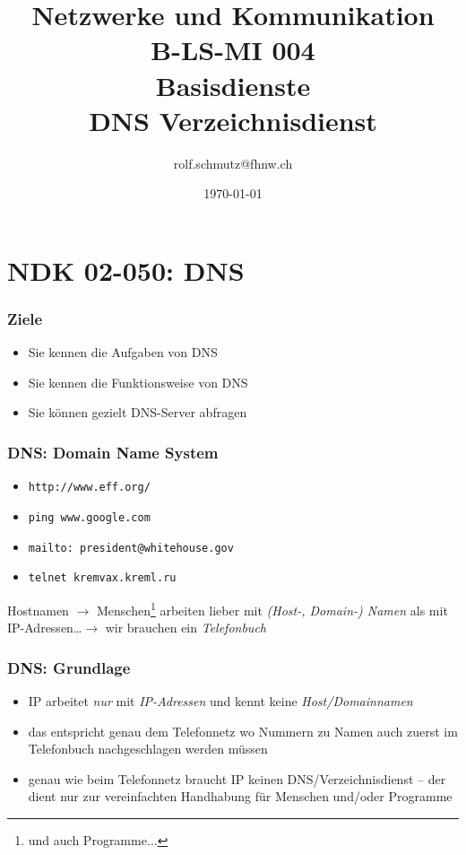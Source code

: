 \documentclass[ignorenonframetext]{beamer}
\date{\today}
\author{rolf.schmutz@fhnw.ch}
\institute{FHNW}
\title{Netzwerke und Kommunikation\\B-LS-MI 004\\Basisdienste\\DNS Verzeichnisdienst}
\begin{document}

\section{NDK 02-050: DNS}



\begin{frame}
\titlepage
\end{frame}



\begin{frame}
\frametitle{Ziele}
\begin{itemize}
	\item{Sie kennen die Aufgaben von DNS}
	\item{Sie kennen die Funktionsweise von DNS}
	\item{Sie k\"onnen gezielt DNS-Server abfragen}
\end{itemize}
\end{frame}



\begin{frame}
\frametitle{DNS: Domain Name System}
\begin{itemize}
	\item{\begin{Huge}\texttt{http://www.eff.org/}\end{Huge}}
	\item{\begin{Huge}\texttt{ping www.google.com}\end{Huge}}
	\item{\begin{Huge}\texttt{mailto: president@whitehouse.gov}\end{Huge}}
	\item{\begin{Huge}\texttt{telnet kremvax.kreml.ru}\end{Huge}}
\end{itemize}
\begin{block}{Hostnamen}
$\rightarrow$ Menschen\footnote{und auch Programme$\ldots$} arbeiten lieber mit {\em (Host-, Domain-) Namen} als mit IP-Adressen\ldots $\rightarrow$ wir brauchen ein \em{Telefonbuch}
\end{block}
\end{frame}

\begin{frame}
\frametitle{DNS: Grundlage}
\begin{itemize}
  \item{IP arbeitet {\em nur} mit {\em IP-Adressen} und kennt keine {\em Host/Domainnamen}}
  \item{das entspricht genau dem Telefonnetz wo Nummern zu Namen auch zuerst im Telefonbuch nachgeschlagen werden m\"ussen}
  \item{genau wie beim Telefonnetz braucht IP keinen DNS/Verzeichnisdienst -- der dient nur zur vereinfachten Handhabung f\"ur Menschen und/oder Programme}
\end{itemize}
\end{frame}
\end{document}
